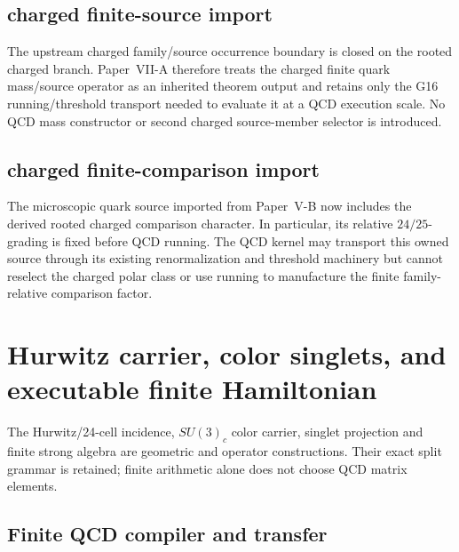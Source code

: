 \documentclass[12pt,a4paper]{article}
\begin{document}
\subsection{charged finite-source import}
\label{p10:sec:v168-charged-source-import}
The upstream charged family/source occurrence boundary is closed on the rooted
charged branch.  Paper~VII-A therefore treats the charged finite quark
mass/source operator as an inherited theorem output and retains only the G16
running/threshold transport needed to evaluate it at a QCD execution scale.
No QCD mass constructor or second charged source-member selector is introduced.




\subsection{charged finite-comparison import}
\label{p10:sec:v169-charged-comparison-import}
The microscopic quark source imported from Paper~V-B now includes the derived
rooted charged comparison character.  In particular, its relative
$24/25$-grading is fixed before QCD running.  The QCD kernel may transport this
owned source through its existing renormalization and threshold machinery but
cannot reselect the charged polar class or use running to manufacture the
finite family-relative comparison factor.





\section{Hurwitz carrier, color singlets, and executable finite Hamiltonian}
\label{p10:sec:v237-a2}
The Hurwitz/24-cell incidence, $SU(3)_c$ color carrier, singlet projection and finite strong algebra are geometric and operator constructions. Their exact split grammar is retained; finite arithmetic alone does not choose QCD matrix elements.

\subsection{Finite QCD compiler and transfer}
\label{p10:sec:strong-sector-ledger}
\end{document}
